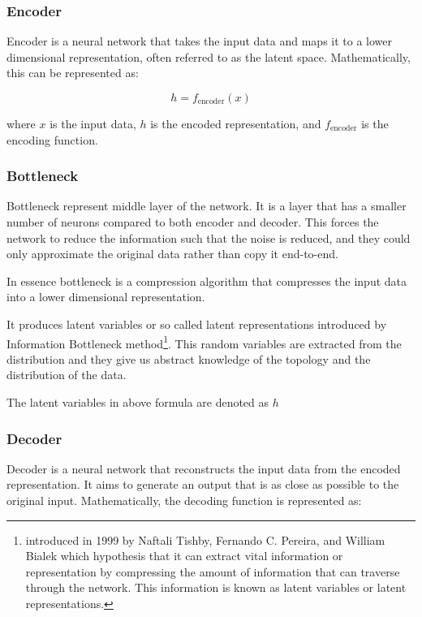 \documentclass{article}
\begin{document}
		\subsubsection{Encoder}

			Encoder is a neural network that takes the input data and maps it to a lower dimensional representation, often referred to as the latent space. Mathematically, this can be represented as:

			\[ h = f_{\text{encoder}}(x) \]

			where \(x\) is the input data, \(h\) is the encoded representation, and \(f_{\text{encoder}}\) is the encoding function.
		
		\subsubsection{Bottleneck}


			Bottleneck represent middle layer of the network. It is a layer that has a smaller number of neurons compared to both encoder and decoder. This forces the network to reduce the information such that the noise is reduced, and they could only approximate the original data rather than copy it end-to-end.

			In essence bottleneck is a compression algorithm that compresses the input data into a lower dimensional representation. 

			It produces latent variables or so called latent representations introduced by Information Bottleneck method\footnote{introduced in 1999 by Naftali Tishby, Fernando C. Pereira, and William Bialek which hypothesis that it can extract vital information or representation by compressing the amount of information that can traverse through the network. This information is known as latent variables or latent representations. 
			}. 
			This random variables are extracted from the distribution and they give us abstract knowledge of the topology and the distribution of the data.

			The latent variables in above formula are denoted as \(h\)

		\subsubsection{Decoder}
			
			Decoder is a neural network that reconstructs the input data from the encoded representation. It aims to generate an output that is as close as possible to the original input. Mathematically, the decoding function is represented as:
\end{document}
